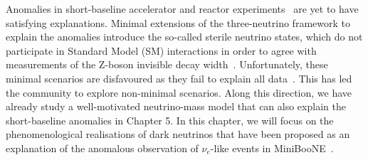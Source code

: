 \graphicspath{{}{miniboone/figs/}{miniboone/}{diagrams/}}

Anomalies in short-baseline accelerator and reactor experiments~\cite{Athanassopoulos:1996jb,Aguilar:2001ty,AguilarArevalo:2007it,Aguilar-Arevalo:2018gpe} are yet to have satisfying explanations. Minimal extensions of the three-neutrino framework to explain the anomalies introduce the so-called sterile neutrino states, which do not participate in Standard Model (SM) interactions in order to agree with measurements of the Z-boson invisible decay width~\cite{ALEPH:2010aa}. Unfortunately, these minimal scenarios are disfavoured as they fail to explain all data~\cite{Collin:2016aqd, Capozzi:2016vac, Dentler:2018sju}. This has led the community to explore non-minimal scenarios. Along this direction, we have already study a well-motivated neutrino-mass model that can also explain the short-baseline anomalies in Chapter 5. In this chapter, we will focus on the phenomenological realisations of dark neutrinos that have been proposed as an explanation of the anomalous observation of $\nu_e$-like events in MiniBooNE~\cite{Aguilar-Arevalo:2018gpe}.

